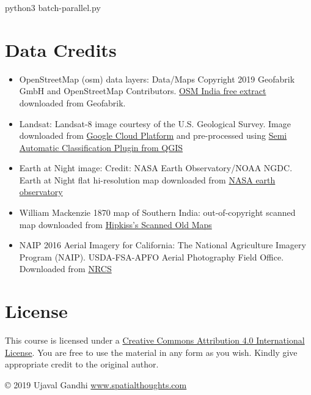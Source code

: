 \documentclass[12pt,a4paper]{article}
\newenvironment{Shaded}{\begin{snugshade}}{\end{snugshade}}
\newcommand{\ExtensionTok}[1]{#1}
\newcommand{\NormalTok}[1]{#1}
\providecommand{\tightlist}{%
  \setlength{\itemsep}{0pt}\setlength{\parskip}{0pt}}
\begin{document}
\begin{Shaded}
\begin{Highlighting}[]
\ExtensionTok{python3}\NormalTok{ batch-parallel.py}
\end{Highlighting}
\end{Shaded}

\hypertarget{data-credits}{%
\section{Data Credits}\label{data-credits}}

\begin{itemize}
\tightlist
\item
  OpenStreetMap (osm) data layers: Data/Maps Copyright 2019 Geofabrik
  GmbH and OpenStreetMap Contributors.
  \href{https://download.geofabrik.de/asia/india.html}{OSM India free
  extract} downloaded from Geofabrik.
\item
  Landsat: Landsat-8 image courtesy of the U.S. Geological Survey. Image
  downloaded from
  \href{https://console.cloud.google.com/marketplace/details/usgs-public-data/landast}{Google
  Cloud Platform} and pre-processed using
  \href{https://fromgistors.blogspot.com/p/semi-automatic-classification-plugin.html}{Semi
  Automatic Classification Plugin from QGIS}
\item
  Earth at Night image: Credit: NASA Earth Observatory/NOAA NGDC. Earth
  at Night flat hi-resolution map downloaded from
  \href{https://earthobservatory.nasa.gov/features/NightLights/page3.php}{NASA
  earth observatory}
\item
  William Mackenzie 1870 map of Southern India: out-of-copyright scanned
  map downloaded from
  \href{http://www.hipkiss.org/data/maps.html}{Hipkiss's Scanned Old
  Maps}
\item
  NAIP 2016 Aerial Imagery for California: The National Agriculture
  Imagery Program (NAIP). USDA-FSA-APFO Aerial Photography Field Office.
  Downloaded from
  \href{https://nrcs.app.box.com/v/naip/folder/18144379349}{NRCS}
\end{itemize}

\hypertarget{license}{%
\section{License}\label{license}}

This course is licensed under a
\href{http://creativecommons.org/licenses/by/4.0/deed.en_US}{Creative
Commons Attribution 4.0 International License}. You are free to use the
material in any form as you wish. Kindly give appropriate credit to the
original author.

© 2019 Ujaval Gandhi
\href{http://spatialthoughts.com}{www.spatialthoughts.com}
\end{document}
